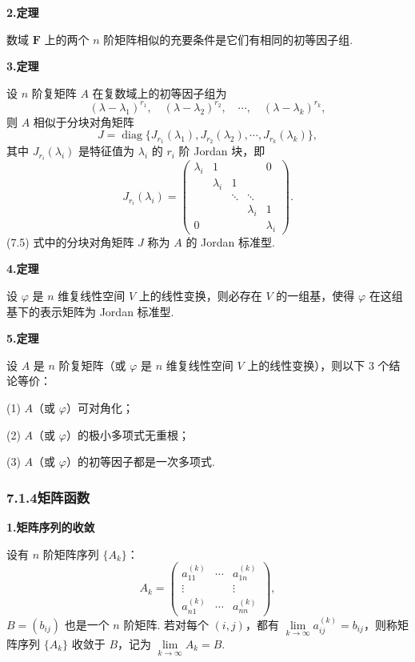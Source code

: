 \documentclass[UTF8,12pt,a4paper,fontset=fandol]{ctexart}
\begin{document}
\noindent\textbf{2.\quad 定理}

数域 $\mathbf{F}$ 上的两个 $n$ 阶矩阵相似的充要条件是它们有相同的初等因子组.

\noindent\textbf{3.\quad 定理}

设 $n$ 阶复矩阵 $A$ 在复数域上的初等因子组为
\[
(\lambda-\lambda_1)^{r_1},\quad
(\lambda-\lambda_2)^{r_2},\quad
\cdots,\quad
(\lambda-\lambda_k)^{r_k},
\]
则 $A$ 相似于分块对角矩阵
\begin{equation}
J=\operatorname{diag}\{J_{r_1}(\lambda_1),J_{r_2}(\lambda_2),\cdots,J_{r_k}(\lambda_k)\},
\tag{7.5}
\end{equation}
其中 $J_{r_i}(\lambda_i)$ 是特征值为 $\lambda_i$ 的 $r_i$ 阶 Jordan 块，即
\[
J_{r_i}(\lambda_i)=
\left(\begin{array}{ccccc}
\lambda_i & 1 &        &        & 0\\
          & \lambda_i & 1      &        &  \\
          &           & \ddots & \ddots &  \\
          &           &        & \lambda_i & 1\\
0         &           &        &           & \lambda_i
\end{array}\right).
\]
(7.5) 式中的分块对角矩阵 $J$ 称为 $A$ 的 Jordan 标准型.

\noindent\textbf{4.\quad 定理}

设 $\varphi$ 是 $n$ 维复线性空间 $V$ 上的线性变换，则必存在 $V$ 的一组基，使得 $\varphi$ 在这组基下的表示矩阵为 Jordan 标准型.

\noindent\textbf{5.\quad 定理}

设 $A$ 是 $n$ 阶复矩阵（或 $\varphi$ 是 $n$ 维复线性空间 $V$ 上的线性变换），则以下 3 个结论等价：

(1) $A$（或 $\varphi$）可对角化；

(2) $A$（或 $\varphi$）的极小多项式无重根；

(3) $A$（或 $\varphi$）的初等因子都是一次多项式.

\subsubsection*{7.1.4\quad 矩阵函数}

\noindent\textbf{1.\quad 矩阵序列的收敛}

设有 $n$ 阶矩阵序列 $\{A_k\}$：
\[
A_k=
\left(\begin{array}{ccc}
a_{11}^{(k)} & \cdots & a_{1n}^{(k)}\\
\vdots       &        & \vdots\\
a_{n1}^{(k)} & \cdots & a_{nn}^{(k)}
\end{array}\right),
\]
$B=(b_{ij})$ 也是一个 $n$ 阶矩阵. 若对每个 $(i,j)$，都有 $\lim\limits_{k\to\infty}a_{ij}^{(k)}=b_{ij}$，则称矩阵序列 $\{A_k\}$ 收敛于 $B$，记为 $\lim\limits_{k\to\infty}A_k=B$.
\end{document}
